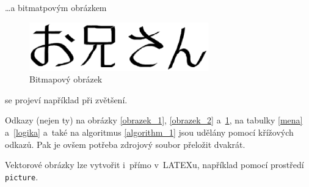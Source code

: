 \documentclass[a4paper,11pt]{article}
\begin{document}
\bigskip \noindent \dots a bitmatpovým obrázkem

\begin{figure}[h]
\centering
\includegraphics[width=220pt]{oniisan2.eps}	
\caption{Bitmapový obrázek}
\label{obrazek_3}
\end{figure}

\bigskip \smallskip \noindent se projeví například při zvětšení.

Odkazy (nejen ty) na obrázky \ref{obrazek_1}, \ref{obrazek_2} a~\ref{obrazek_3}, na tabulky \ref{mena} a~\ref{logika} a~také na algoritmus \ref{algorithm_1} jsou udělány pomocí křížových odkazů. Pak je ovšem potřeba zdrojový soubor přeložit dvakrát.

Vektorové obrázky lze vytvořit i~přímo v~LATEXu, například pomocí prostředí \texttt{picture}.
\end{document}
